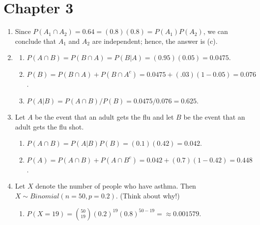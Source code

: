 \documentclass{article}\usepackage[]{graphicx}\usepackage[]{color}
\begin{document}
\section{Chapter 3}

\begin{enumerate}

  \item Since $P\left(A_1 \cap A_2\right) = 0.64 = (0.8)(0.8) = P\left(A_1\right)P\left(A_2\right)$, we can conclude that $A_1$ and $A_2$ are independent; hence, the answer is (c).
  
  \item
  
  \begin{enumerate}
  
    \item $P\left(A \cap B\right) = P\left(B \cap A\right) = P\left(B|A\right) = (0.95)(0.05) = 0.0475$.
    
    \item $P\left(B\right) = P\left(B \cap A\right) + P\left(B \cap A^c\right) = 0.0475 + (.03)(1 - 0.05) = 0.076$.
    
    \item $P\left(A|B\right) = P\left(A \cap B\right) / P\left(B\right) = 0.0475 / 0.076 = 0.625$.
  
  \end{enumerate}
  
  \item Let $A$ be the event that an adult gets the flu and let $B$ be the event that an adult gets the flu shot. 
  
  \begin{enumerate}
  
    \item $P\left(A \cap B\right) = P\left(A|B\right)P\left(B\right) = (0.1)(0.42) = 0.042$.
    
    \item $P\left(A\right) = P\left(A \cap B\right) + P\left(A \cap B^c\right) = 0.042 + (0.7)(1 - 0.42) = 0.448$.
    
  \end{enumerate}
  
  \item Let $X$ denote the number of people who have asthma. Then $X \sim Binomial\left(n = 50, p = 0.2\right)$. (Think about why!)
  
  \begin{enumerate}
  
    \item $P\left(X = 19\right) = \binom{50}{19}(0.2)^{19}(0.8)^{50-19} = \approx 0.001579$.
    

\end{enumerate}
\end{enumerate}
\end{document}
